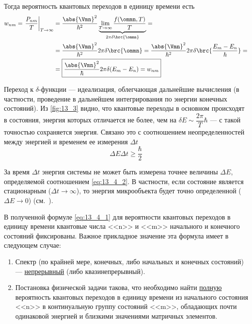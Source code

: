 Тогда вероятность квантовых переходов в единицу времени есть
\begin{align}
w_{nm} = \left . \frac{P_{nm}}{T}\right|_{T \to \infty} 
  & = \frac{\abs{\Vmn}^2}{\hbar^2} \underbrace{\lim_{T \to \infty} \frac{f(\ommn, T)}{T}}_{2\pi\delta \brc{\ommn}} = \nonumber \\
  & = \frac{\abs{\Vmn}^2}{\hbar^2} 2 \pi \delta \brc{\ommn}
  = \frac{\abs{\Vmn}^2}{\hbar^2} 2 \pi \delta \brc{\frac{E_m - E_n}{\hbar}} = \nonumber \\
  \label{eq:13_4_1}
  &= \boxed {
    \frac{\abs{\Vmn}^2}{\hbar} 2 \pi \delta (E_m - E_n) = w_{nm}
  }
\end{align}

Переход к $\delta$-функции --- идеализация, облегчающая дальнейшие вычисления (в частности, проведение в дальнейшем интегрирования по энергии конечных состояний). Из \autoref{fig:13_3} видно, что квантовые переходы в основном происходят в состояния, энергия которых отличается не более, чем на $\delta E \sim \dfrac{2\pi}{T} \hbar$ --- с такой точностью сохраняется энергия. Связано это  с соотношением неопределенностей между энергией и временем ее измерения $\Delta t$
\begin{equation}
\label{eq:13_4_2}
\boxed{\Delta E \Delta t \ge \frac{\hbar}{2}} 
\end{equation}

За время $\Delta t$ энергия системы не может быть измерена точнее величины $\Delta E$, определяемой соотношением \eqref{eq:13_4_2}. В частности, если состояние является стационарным ($\Delta t \to \infty$), то энергия микрообъекта будет точно определенной ($\Delta E \to 0$) (см.~).

В полученной формуле \eqref{eq:13_4_1} для вероятности квантовых переходов в единицу времени квантовые числа <<n>> и <<m>> начального и конечного состояний фиксированы. Важное прикладное значение эта формула имеет в следующем случае:
\begin{enumerate}
\item Спектр (по крайней мере, конечных, либо начальных и конечных состояний) --- \underline{непрерывный} (либо квазинепрерывный).
\item Постановка физической задачи такова, что необходимо найти \underline{полную} вероятность квантовых переходов в единицу времени из начального состояния <<n>> в континуальную группу состояний <<m>>, обладающих почти одинаковой энергией и близкими значениями матричных элементов.
\end{enumerate}

